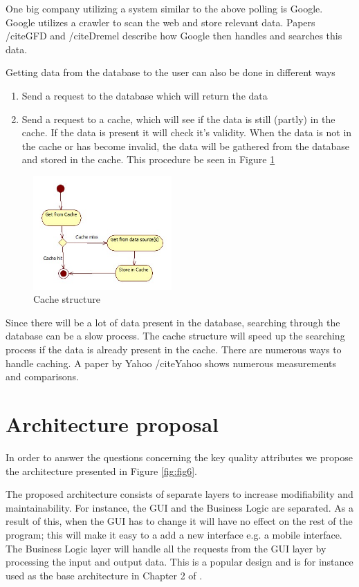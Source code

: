 \documentclass{article}
\begin{document}
One big company utilizing a system similar to the above polling is Google. Google utilizes a crawler to scan the web and store relevant data. Papers /cite{GFD} and /cite{Dremel} describe how Google then handles and searches this data.

Getting data from the database to the user can also be done in different ways
\begin{enumerate}
\item Send a request to the database which will return the data
\item Send a request to a cache, which will see if the data is still (partly) in the cache. If the data is present it will check it's validity. When the data is not in the cache or has become invalid, the data will be gathered from the database and stored in the cache.  This procedure be seen in Figure \ref{fig:fig5}
\end{enumerate}

\begin{figure}[!]
\centering
\includegraphics[width=200px]{Cached}
\caption{Cache structure}
\label{fig:fig5}
\end{figure}

Since there will be a lot of data present in the database, searching through the database can be a slow process. The cache structure will speed up the searching process if the data is already present in the cache. There are numerous ways to handle caching. A paper by Yahoo /cite{Yahoo} shows numerous measurements and comparisons.
\section*{Architecture proposal}

In order to answer the questions concerning the key quality attributes we propose the architecture presented in Figure \ref{fig:fig6}.


The proposed architecture consists of separate layers to increase
modifiability and maintainability. For instance, the GUI and the Business Logic
are separated. As a result of this, when the GUI has to change it will have no effect on
the rest of the program; this will make it easy to a add a new interface e.g.
a mobile interface. The Business Logic layer will handle all the requests from
the GUI layer by processing the input and output data.
This is a popular design and is for instance used as the base architecture in Chapter 2 of \cite{MSDN}.
\end{document}

